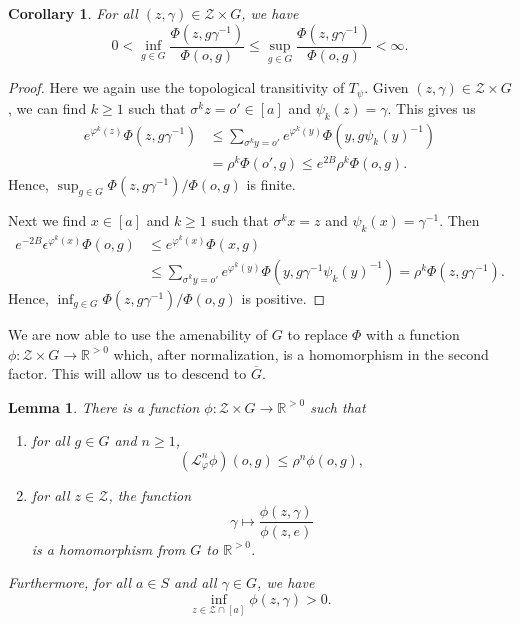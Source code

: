 \documentclass[11pt,letterpaper]{amsart}
\newtheorem{corollary}[theorem]{Corollary}
\newtheorem{lemma}[theorem]{Lemma}
\theoremstyle{definition}
\numberwithin{equation}{section}
\numberwithin{theorem}{section}
\def\e{\epsilon}
\def\R{\mathbb{R}}
\def\vp{\varphi}
\def\R{\mathbb R}
\def\oG{\overline{G}}
\begin{document}
\begin{corollary}\label{cor:gamma_bounded}
For all $(z,\gamma) \in \mathcal Z \times G$, we have
\[
0 < \inf_{g \in G} \frac{\Phi(z, g\gamma^{-1})}{\Phi(o,g)} \le
\sup_{g \in G} \frac{\Phi(z,g\gamma^{-1})}{\Phi(o,g)} < 
\infty.
\]
\end{corollary}

\begin{proof}
Here we again use the topological transitivity of $T_\psi$.
Given $(z,\gamma) \in \mathcal Z \times G$, we can find $k \ge 1$ 
such that $\sigma^kz=o'\in [a]$ and $\psi_k(z)=\gamma$. This gives us
\begin{align*}
e^{\vp^k(z)}\Phi(z,g\gamma^{-1}) 
&\le
\sum_{\sigma^ky=o'} e^{\vp^k(y)} \Phi(y,g\psi_k(y)^{-1}) \\
&=\rho^k\Phi(o',g) \le e^{2B} \rho^k \Phi(o,g).
\end{align*}
Hence,
$\sup_{g \in G} \Phi(z,g\gamma^{-1})/\Phi(o,g)$ is finite.

Next we find $x \in [a]$ and $k \ge 1$ such that $\sigma^kx = z$ and $\psi_k(x)=\gamma^{-1}$.
Then
\begin{align*}
e^{-2B}\e^{\vp^k(x)}\Phi(o,g) 
&\le
e^{\vp^k(x)} \Phi(x,g) 
\\
&\le \sum_{\sigma^k y=o'} e^{\vp^k(y)} \Phi(y,g\gamma^{-1}\psi_k(y)^{-1})
= \rho^k\Phi(z,g\gamma^{-1}).
\end{align*}
Hence,
$\inf_{g \in G} \Phi(z,g\gamma^{-1})/\Phi(o,g)$ is positive.
\end{proof}

We are now able to use the amenability of $G$ to replace $\Phi$ with a function $\phi : \mathcal Z \times G \to \R^{>0}$ which, after normalization, is a homomorphism in the second factor. This will allow us to descend to $\oG$.


\begin{lemma}\label{lem:inequality_for_phi}
There is a function $\phi : \mathcal Z \times G \to \mathbb R^{>0}$ such that
\begin{enumerate}
\item
for all $g \in G$ and $n \ge 1$,
\[
(\mathcal L_{\vp}^n \phi)(o,g) \le \rho^n \phi(o,g),
\]
\item
for all $z \in \mathcal Z$, the function
\[
\gamma \mapsto \frac{\phi(z,\gamma)}{\phi(z,e)}
\]
is a homomorphism from $G$ to $\mathbb R^{>0}$.
\end{enumerate}
Furthermore, for all $a \in S$ and all $\gamma \in G$, we have
\[
\inf_{z \in \mathcal Z \cap [a]} \phi(z,\gamma) >0.
\]
\end{lemma}
\end{document}
